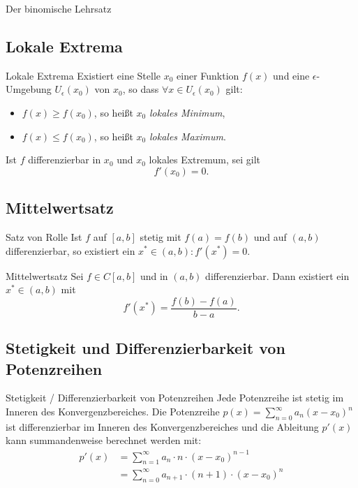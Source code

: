 \documentclass[german]{spicker}
\begin{document}
\begin{defi}{Der binomische Lehrsatz}
\subsection{Lokale Extrema}

\begin{defi}{Lokale Extrema}
    Existiert eine Stelle $x_0$ einer Funktion $f(x)$ und eine $\epsilon$-Umgebung $U_\epsilon (x_0)$ von $x_0$, so dass $\forall x \in U_\epsilon (x_0)$ gilt:
    \begin{itemize}
        \item $f(x) \geq f(x_0)$, so heißt $x_0$ \emph{lokales Minimum},
        \item $f(x) \leq f(x_0)$, so heißt $x_0$ \emph{lokales Maximum}.
    \end{itemize}

    Ist $f$ differenzierbar in $x_0$ und $x_0$ lokales Extremum, sei gilt
    $$
        f'(x_0) = 0.
    $$
\end{defi}

\subsection{Mittelwertsatz}

\begin{bonus}{Satz von Rolle}
    Ist $f$ auf $[a, b]$ stetig mit $f(a) = f(b)$ und auf $(a, b)$ differenzierbar, so existiert ein $x^* \in (a, b) : f'(x^*) = 0$.
\end{bonus}

\begin{defi}{Mittelwertsatz}
    Sei $f \in C[a, b]$ und in $(a, b)$ differenzierbar.
    Dann existiert ein $x^* \in (a, b)$ mit
    $$
        f'(x^*) = \frac{f(b)  -f(a)}{b-a}.
    $$
\end{defi}

\subsection{Stetigkeit und Differenzierbarkeit von Potenzreihen}

\begin{defi}{Stetigkeit / Differenzierbarkeit von Potenzreihen}
    Jede Potenzreihe ist stetig im Inneren des Konvergenzbereiches.
    Die Potenzreihe $p(x) = \sum^\infty_{n=0} a_n(x-x_0)^n$ ist differenzierbar im Inneren des Konvergenzbereiches und die Ableitung $p'(x)$ kann summandenweise berechnet werden mit:
    $$
        \begin{aligned}
            p'(x) & = \sum^\infty_{n=1} a_n \cdot n \cdot (x-x_0)^{n-1}       \\
                  & = \sum^\infty_{n=0} a_{n+1} \cdot (n+1) \cdot (x-x_0)^{n}
        \end{aligned}
    $$
\end{defi}


\end{defi}
\end{document}
